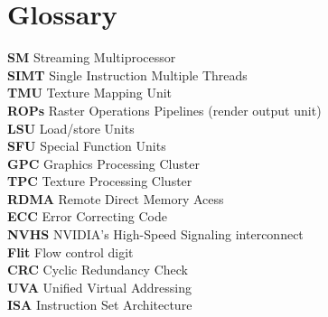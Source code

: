 \section{Glossary}

\textbf{SM} Streaming Multiprocessor \\
\textbf{SIMT} Single Instruction Multiple Threads \\
\textbf{TMU} Texture Mapping Unit \\
\textbf{ROPs} Raster Operations Pipelines (render output unit) \\
\textbf{LSU} Load/store Units \\
\textbf{SFU} Special Function Units \\
\textbf{GPC} Graphics Processing Cluster \\
\textbf{TPC} Texture Processing Cluster \\
\textbf{RDMA} Remote Direct Memory Acess \\
\textbf{ECC} Error Correcting Code \\
\textbf{NVHS} NVIDIA's High-Speed Signaling interconnect \\
\textbf{Flit} Flow control digit \\
\textbf{CRC} Cyclic Redundancy Check \\
\textbf{UVA} Unified Virtual Addressing \\
\textbf{ISA} Instruction Set Architecture \\
